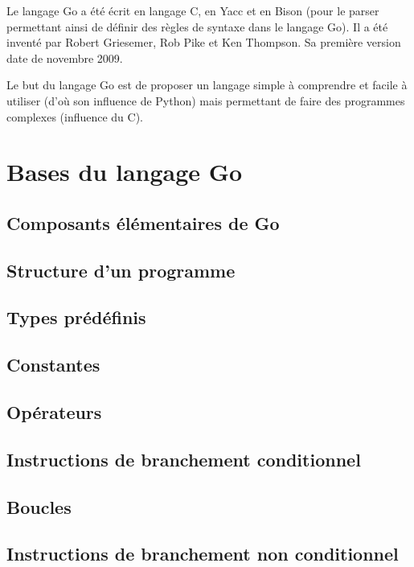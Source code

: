 \documentclass[11pt]{article}
\begin{document}
Le langage Go a été écrit en langage C, en Yacc et en Bison (pour le parser permettant ainsi de définir des règles de syntaxe dans le langage Go). Il a été inventé par Robert Griesemer, Rob Pike et Ken Thompson. Sa première version date de novembre 2009. 

Le but du langage Go est de proposer un langage simple à comprendre et facile à utiliser (d'où son influence de Python) mais permettant de faire des programmes complexes (influence du C). 


\section{Bases du langage Go}

\subsection{Composants élémentaires de Go}

\subsection{Structure d'un programme}

\subsection{Types prédéfinis}

\subsection{Constantes}

\subsection{Opérateurs}

\subsection{Instructions de branchement conditionnel}

\subsection{Boucles}

\subsection{Instructions de branchement non conditionnel}
\end{document}
